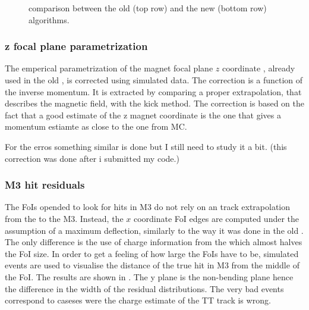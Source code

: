 \begin{figure}[t]
  \centering
  \begin{subfigure}{0.5\textwidth}
    \scalebox{.6}{}
    \caption{}
    \label{mvTTm_chi2}
  \end{subfigure}%
  \hfill%
  \begin{subfigure}{0.5\textwidth}
    \scalebox{.6}{}
    \caption{}
    \label{mvm_chi2}
  \end{subfigure}
  \caption{\chisq comparison between the old \mvm (top row) and the new \mvTTm (bottom row) algorithms.}
 \label{mvm_chi2_comp}
\end{figure}

\subsubsection{z focal plane parametrization}
The emperical parametrization of the magnet focal plane $z$ coordinate \cite{blah}, already used in  the old \mvm,
is corrected using simulated data. The correction is a function of the inverse momentum. It is extracted by comparing
a proper extrapolation, that describes the magnetic field, with the kick method. The correction is based on the fact
that a good estimate of the z magnet coordinate is the one that gives a momentum estiamte as close to the one from MC.

For the erros something similar is done but I still need to study it a bit. (this correction was done after i submitted my code.)

\subsubsection{M3 hit residuals}
The FoIs opended to look for hits in M3 do not rely on an track extrapolation from the \velo to the M3.
Instead, the $x$ coordinate FoI edges are computed under the assumption of a maximum deflection, similarly
to the way it was done in the old \mvm. The only difference is the use of charge information from the \ttracker
which almost halves the FoI size. In order to get a feeling of how large the FoIs have to be, simulated events are
used to visualise the distance of the true hit in M3 from the middle of the FoI. The results are shown in .
The y plane is the non-bending plane hence the difference in the width of the residual distributions.
The very bad events correspond to caseses were the charge estimate of the \velo TT track is wrong.

